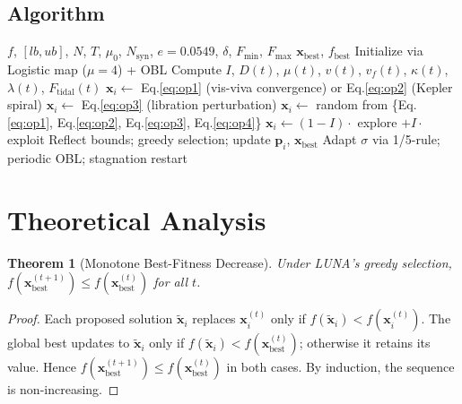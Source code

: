 \documentclass[review]{elsarticle}
\newtheorem{theorem}{Theorem}
\theoremstyle{definition}
\begin{document}
\subsection{Algorithm}

\begin{algorithm}[htbp]
\caption{LUNA}
\label{alg:luna}
\begin{algorithmic}[1]
\Require $f$, $[lb,ub]$, $N$, $T$, $\mu_0$, $N_{\mathrm{syn}}$, $e=0.0549$, $\delta$, $F_{\min}$, $F_{\max}$
\Ensure $\mathbf{x}_{\mathrm{best}}$, $f_{\mathrm{best}}$
\State Initialize via Logistic map ($\mu=4$) + OBL
  \State Compute $I$, $D(t)$, $\mu(t)$, $v(t)$, $v_f(t)$, $\kappa(t)$, $\lambda(t)$, $F_{\mathrm{tidal}}(t)$
      \State $\mathbf{x}_i \gets$ Eq.\eqref{eq:op1} (vis-viva convergence) or Eq.\eqref{eq:op2} (Kepler spiral)
      \State $\mathbf{x}_i \gets$ Eq.\eqref{eq:op3} (libration perturbation)
      \State $\mathbf{x}_i \gets$ random from \{Eq.\eqref{eq:op1}, Eq.\eqref{eq:op2}, Eq.\eqref{eq:op3}, Eq.\eqref{eq:op4}\}
    \Else
      \State $\mathbf{x}_i \gets (1-I) \cdot$ explore $+ I \cdot$ exploit
    \EndIf
    \State Reflect bounds; greedy selection; update $\mathbf{p}_i$, $\mathbf{x}_{\mathrm{best}}$
  \EndFor
  \State Adapt $\sigma$ via 1/5-rule; periodic OBL; stagnation restart
\EndFor
\end{algorithmic}
\end{algorithm}

\section{Theoretical Analysis}
\label{sec:theory}

\begin{theorem}[Monotone Best-Fitness Decrease]
\label{thm:monotone}
Under LUNA's greedy selection, $f(\mathbf{x}_{\mathrm{best}}^{(t+1)}) \leq f(\mathbf{x}_{\mathrm{best}}^{(t)})$ for all $t$.
\end{theorem}
\begin{proof}
Each proposed solution $\tilde{\mathbf{x}}_i$ replaces $\mathbf{x}_i^{(t)}$ only if $f(\tilde{\mathbf{x}}_i) < f(\mathbf{x}_i^{(t)})$. The global best updates to $\tilde{\mathbf{x}}_i$ only if $f(\tilde{\mathbf{x}}_i) < f(\mathbf{x}_{\mathrm{best}}^{(t)})$; otherwise it retains its value. Hence $f(\mathbf{x}_{\mathrm{best}}^{(t+1)}) \leq f(\mathbf{x}_{\mathrm{best}}^{(t)})$ in both cases. By induction, the sequence is non-increasing.
\end{proof}
\end{document}
